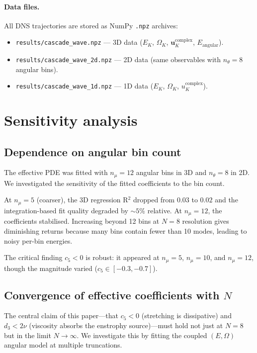 \documentclass[11pt,a4paper]{article}
\theoremstyle{remark}
\begin{document}
\paragraph{Data files.}
All DNS trajectories are stored as NumPy \texttt{.npz} archives:
\begin{itemize}
\item \texttt{results/cascade\_wave.npz} --- 3D data ($E_K$, $\Omega_K$, $\mathbf{u}_K^{\mathrm{complex}}$, $E_{\mathrm{angular}}$).
\item \texttt{results/cascade\_wave\_2d.npz} --- 2D data (same observables with $n_\theta = 8$ angular bins).
\item \texttt{results/cascade\_wave\_1d.npz} --- 1D data ($E_K$, $\Omega_K$, $u_K^{\mathrm{complex}}$).
\end{itemize}

\section{Sensitivity analysis}\label{app:sensitivity}

\subsection{Dependence on angular bin count}

The effective PDE was fitted with $n_\mu = 12$ angular bins in 3D and $n_\theta = 8$ in 2D.  We investigated the sensitivity of the fitted coefficients to the bin count.

At $n_\mu = 5$ (coarser), the 3D regression R$^2$ dropped from $0.03$ to $0.02$ and the integration-based fit quality degraded by $\sim 5\%$ relative.  At $n_\mu = 12$, the coefficients stabilised.  Increasing beyond 12 bins at $N = 8$ resolution gives diminishing returns because many bins contain fewer than 10 modes, leading to noisy per-bin energies.

The critical finding $c_5 < 0$ is robust: it appeared at $n_\mu = 5$, $n_\mu = 10$, and $n_\mu = 12$, though the magnitude varied ($c_5 \in [-0.3, -0.7]$).

\subsection{Convergence of effective coefficients with $N$}\label{app:convergence}

The central claim of this paper---that $c_5 < 0$ (stretching is dissipative) and $d_3 < 2\nu$ (viscosity absorbs the enstrophy source)---must hold not just at $N = 8$ but in the limit $N \to \infty$.  We investigate this by fitting the coupled $(E, \Omega)$ angular model at multiple truncations.
\end{document}
